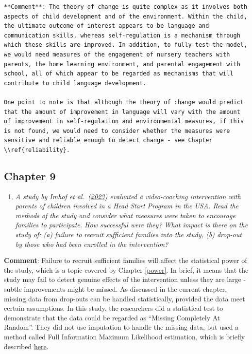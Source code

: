 \documentclass{krantz}
\providecommand{\tightlist}{%
\setlength{\itemsep}{0pt}\setlength{\parskip}{0pt}}
\begin{document}
\begin{verbatim}
**Comment**: The theory of change is quite complex as it involves both aspects of child development and of the environment. Within the child, the ultimate outcome of interest appears to be language and communication skills, whereas self-regulation is a mechanism through which these skills are improved. In addition, to fully test the model, we would need measures of the engagement of nursery teachers with parents, the home learning environment, and parental engagement with school, all of which appear to be regarded as mechanisms that will contribute to child language development.

One point to note is that although the theory of change would predict that the amount of improvement in language will vary with the amount of improvement in self-regulation and environmental measures, if this is not found, we would need to consider whether the measures were sensitive and reliable enough to detect change - see Chapter \\ref{reliability}.
\end{verbatim}

\hypertarget{chapter-9}{%
\subsection{Chapter 9}\label{chapter-9}}

\begin{enumerate}
\def\labelenumi{\arabic{enumi}.}
\tightlist
\item
  \emph{A study by Imhof et al.~(\href{file:///Users/dorothybishop/Rprojects/EvaluatingWhatWorks2023/_book/dropouts.html\#ref-imhof2023}{2023}) evaluated a video-coaching intervention with parents of children involved in a Head Start Program in the USA. Read the methods of the study and consider what measures were taken to encourage families to participate. How successful were they? What impact is there on the study of: (a) failure to recruit sufficient families into the study, (b) drop-out by those who had been enrolled in the intervention?}
\end{enumerate}

\textbf{Comment}: Failure to recruit sufficient families will affect the statistical power of the study, which is a topic covered by Chapter \ref{power}. In brief, it means that the study may fail to detect genuine effects of the intervention unless they are large - subtle improvements might be missed. As discussed in the current chapter, missing data from drop-outs can be handled statistically, provided the data meet certain assumptions. In this study, the researchers did a statistical test to demonstrate that the data could be regarded as ``Missing Completely At Random''. They did not use imputation to handle the missing data, but used a method called Full Information Maximum Likelihood estimation, which is briefly described \href{https://www.missingdata.nl/missing-data/missing-data-methods/full-information-maximum-likelihood/}{here}.
\end{document}
